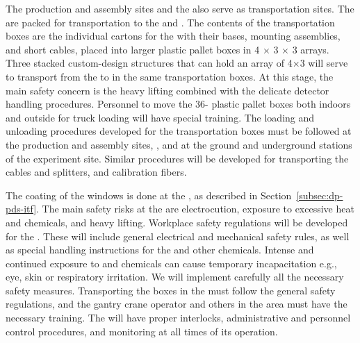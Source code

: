 The production and assembly sites and the  also serve as transportation sites. The  are packed for transportation to the  and . The contents of the transportation boxes are the individual cartons for the  with their bases, mounting assemblies, and short cables, placed into larger plastic pallet boxes in \num{4} $\times$ \num{3} $\times$ \num{3} arrays. %
Three stacked custom-design structures that can hold an array of 4$\times$3
  will serve to transport   from the   to  in the same transportation boxes. 
At this stage, the main safety concern is the heavy lifting combined with the delicate detector handling procedures. 
Personnel to move the \num{36}- plastic pallet boxes both indoors and outside for truck loading will have special training. The loading and unloading procedures developed for the  transportation boxes must be followed at the production and assembly sites, , and at the ground and underground stations of the experiment site. Similar procedures will be developed for transporting the  cables and splitters, and calibration fibers.

The  coating of the  windows is done at the , as described in Section~\ref{subsec:dp-pds-itf}. %
The main safety risks at the  are electrocution, exposure to excessive heat and chemicals, and heavy lifting. Workplace safety regulations will be developed for the . These will include general electrical and mechanical safety rules, as well as special handling instructions for the  and other chemicals. Intense and continued exposure to  and chemicals can cause temporary incapacitation e.g., eye, skin or respiratory irritation. We will implement carefully all the necessary safety measures. %
Transporting the  boxes in the  must follow the general safety regulations, and the gantry crane operator and others in the area must have the necessary training. The  will have proper interlocks, administrative and personnel control procedures, and monitoring at all times of its operation.

